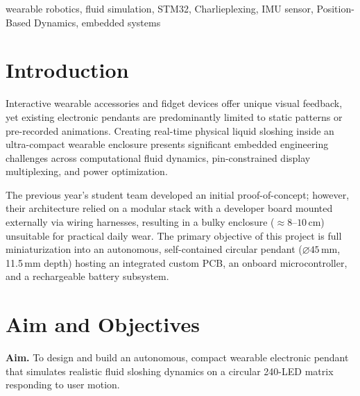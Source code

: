 \documentclass[conference]{IEEEtran}
\begin{document}
\begin{IEEEkeywords}
wearable robotics, fluid simulation, STM32, Charlieplexing, IMU sensor, Position-Based Dynamics, embedded systems
\end{IEEEkeywords}

\section{Introduction}
Interactive wearable accessories and fidget devices offer unique visual feedback, yet existing electronic pendants are predominantly limited to static patterns or pre-recorded animations. Creating real-time physical liquid sloshing inside an ultra-compact wearable enclosure presents significant embedded engineering challenges across computational fluid dynamics, pin-constrained display multiplexing, and power optimization.

The previous year's student team developed an initial proof-of-concept; however, their architecture relied on a modular stack with a developer board mounted externally via wiring harnesses, resulting in a bulky enclosure ($\approx 8\text{--}10$\,cm) unsuitable for practical daily wear. The primary objective of this project is full miniaturization into an autonomous, self-contained circular pendant ($\varnothing 45$\,mm, 11.5\,mm depth) hosting an integrated custom PCB, an onboard microcontroller, and a rechargeable battery subsystem.

\section{Aim and Objectives}
\textbf{Aim.} To design and build an autonomous, compact wearable electronic pendant that simulates realistic fluid sloshing dynamics on a circular 240-LED matrix responding to user motion.
\end{document}

